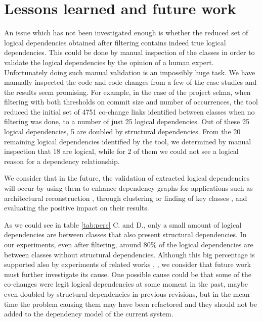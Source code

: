 \documentclass[conference]{IEEEtran}
\begin{document}
 
\section{Lessons learned and future work}

An issue which has not been investigated enough is whether the reduced set of logical dependencies obtained after filtering contains indeed true logical dependencies. This could be done by manual inspection of the classes in order to validate the logical dependencies by the opinion of a human expert. Unfortunately doing such manual validation is an impossibly huge task. We have manually inspected the code and code changes from a few of the case studies and the results seem promising. For example, in the case of the project selma, when filtering with both thresholds on commit size and number of occurrences, the tool reduced the initial set of 4751 co-change links identified between classes when no filtering was done, to a number of just 25 logical dependencies. Out of these 25 logical dependencies, 5 are doubled by structural dependencies. From the 20 remaining logical dependencies identified by the tool, we determined by manual inspection that 18 are logical, while for 2 of them we could not see a logical reason for a dependency relationship. 

We consider that in the future, the validation of extracted logical dependencies will occur by using them to enhance dependency graphs for applications such as architectural reconstruction \cite{Shtern:2012:CMS:2332427.2332428}, \cite{sar}  through clustering \cite{SoraConti} or finding of key classes \cite{PagerankENASE}, and evaluating the positive impact on their results.

As we could see in table \ref{tab:perc} C. and D., only a small amount of logical dependencies are between classes that also present structural dependencies.  In our experiments, even after filtering, around 80\% of the logical dependencies are between classes without structural dependencies. Although this big percentage is supported also by experiments of related works \cite{DBLP:journals/jss/AjienkaC17}, \cite{Oliva:2011:ISL:2067853.2068086}, we consider that future work must further investigate its cause. One possible cause could be that some of the co-changes were legit logical dependencies at some moment in the past, maybe even doubled by structural dependencies in previous revisions, but in the mean time the problem causing them may have been refactored and they should not be added to the dependency model of the current system.  
\end{document}

